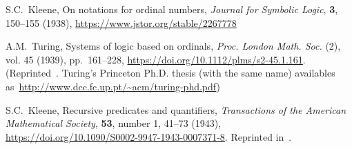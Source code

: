 \documentclass[12pt]{article}
\theoremstyle{remark}
\newcommand{\bibquote}[1]{}
\newcommand{\nb}[1]{{\color{red}}}
\begin{document}
\begin{thebibliography}{99}
S.C.~Kleene, On notations for ordinal numbers, \emph{Journal for Symbolic Logic}, \textbf{3}, 150--155 (1938), \url{https://www.jstor.org/stable/2267778}

\bibquote{\nb{\rus{Определяются рекурсивные (Herbrand-G\"odel recursive) и частично рекурсивные (partial recursive) функции с помощью исчисления равенств. Отмечается эквивалентность с определениями Тьюринга и с Church--Kleene $\lambda$-definability. Определяется $\mu$-оператор на частичных функциях и утверждается, что он не выводит из класса частично рекурсивных функций, с намёком на доказательство на с. 152--153. Далее определяются системы обозначений для ординалов.}}}

A.M.~Turing, Systems of logic based on ordinals, \emph{Proc. London Math. Soc.} (2), vol. 45 (1939), pp.~161--228, \url{https://doi.org/10.1112/plms/s2-45.1.161}.  (Reprinted~\cite[p.~154--222]{Davis1965}. Turing's Princeton Ph.D. thesis (with the same name) availables as~\url{http://www.dcc.fc.up.pt/~acm/turing-phd.pdf})

S.C.~Kleene, Recursive predicates and quantifiers, \emph{Transactions of the American Mathematical Society}, \textbf{53}, number 1, 41--73 (1943), \url{https://doi.org/10.1090/S0002-9947-1943-0007371-8}. Reprinted in~\cite[p.254--287]{Davis1965}.


\end{thebibliography}
\end{document}
